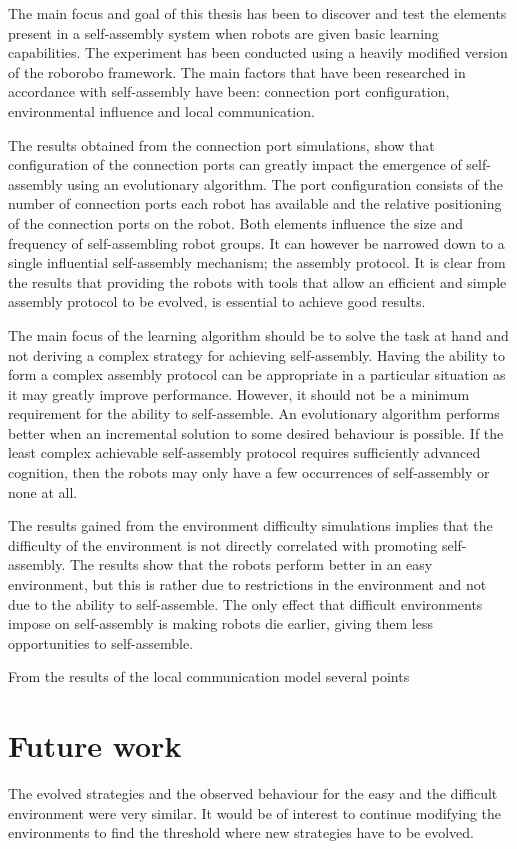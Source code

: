 The main focus and goal of this thesis has been to discover and test the elements present in a self-assembly system when robots are given basic learning capabilities.
The experiment has been conducted using a heavily modified version of the roborobo framework.
The main factors that have been researched in accordance with self-assembly have been: connection port configuration, environmental influence and local communication.

The results obtained from the connection port simulations, show that configuration of the connection ports can greatly impact the emergence of self-assembly using an evolutionary algorithm.
The port configuration consists of the number of connection ports each robot has available and the relative positioning of the connection ports on the robot.
Both elements influence the size and frequency of self-assembling robot groups.
It can however be narrowed down to a single influential self-assembly mechanism; the assembly protocol.
It is clear from the results that providing the robots with tools that allow an efficient and simple assembly protocol to be evolved, is essential to achieve good results.

The main focus of the learning algorithm should be to solve the task at hand and not deriving a complex strategy for achieving self-assembly.
Having the ability to form a complex assembly protocol can be appropriate in a particular situation as it may greatly improve performance.
However, it should not be a minimum requirement for the ability to self-assemble.
An evolutionary algorithm performs better when an incremental solution to some desired behaviour is possible.
If the least complex achievable self-assembly protocol requires sufficiently advanced cognition, then the robots may only have a few occurrences of self-assembly or none at all.

The results gained from the environment difficulty simulations implies that the difficulty of the environment is not directly correlated with promoting self-assembly.
The results show that the robots perform better in an easy environment, but this is rather due to restrictions in the environment and not due to the ability to self-assemble.
The only effect that difficult environments impose on self-assembly is making robots die earlier, giving them less opportunities to self-assemble.

From the results of the local communication model several points


\section{Future work}
The evolved strategies and the observed behaviour for the easy and the difficult environment were very similar.
It would be of interest to continue modifying the environments to find the threshold where new strategies have to be evolved. 